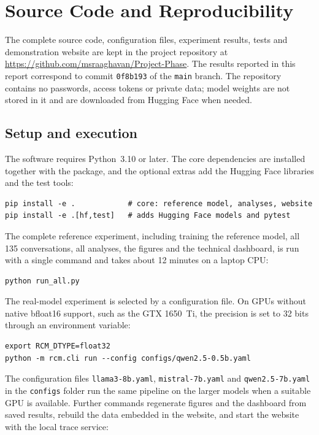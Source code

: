 \chapter{Source Code and Reproducibility}
The complete source code, configuration files, experiment results, tests and demonstration website are kept in the project repository at \url{https://github.com/msraaghavan/Project-Phase}. The results reported in this report correspond to commit \texttt{0f8b193} of the \texttt{main} branch. The repository contains no passwords, access tokens or private data; model weights are not stored in it and are downloaded from Hugging Face when needed.

\section{Setup and execution}
The software requires Python~3.10 or later. The core dependencies are installed together with the package, and the optional extras add the Hugging Face libraries and the test tools:

\begin{verbatim}
pip install -e .            # core: reference model, analyses, website
pip install -e .[hf,test]   # adds Hugging Face models and pytest
\end{verbatim}

The complete reference experiment, including training the reference model, all 135 conversations, all analyses, the figures and the technical dashboard, is run with a single command and takes about 12 minutes on a laptop CPU:

\begin{verbatim}
python run_all.py
\end{verbatim}

The real-model experiment is selected by a configuration file. On GPUs without native bfloat16 support, such as the GTX 1650~Ti, the precision is set to 32 bits through an environment variable:

\begin{verbatim}
export RCM_DTYPE=float32
python -m rcm.cli run --config configs/qwen2.5-0.5b.yaml
\end{verbatim}

The configuration files \nolinkurl{llama3-8b.yaml}, \nolinkurl{mistral-7b.yaml} and \nolinkurl{qwen2.5-7b.yaml} in the \nolinkurl{configs} folder run the same pipeline on the larger models when a suitable GPU is available. Further commands regenerate figures and the dashboard from saved results, rebuild the data embedded in the website, and start the website with the local trace service:

